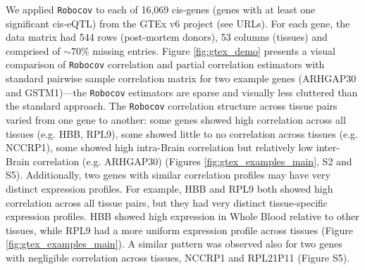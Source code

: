\documentclass{bioinfo}
\def\Robocov{\texttt{Robocov}}
\begin{document}
We applied \Robocov{} to each of 16,069 cis-genes (genes with at least one significant cis-eQTL) from the GTEx v6 project \cite{dey2017} (see URLs). For each gene, the data matrix had 544 rows (post-mortem donors), 53 columns (tissues) and comprised of $\sim70\%$ missing entries.  Figure \ref{fig:gtex_demo} presents a visual comparison of \Robocov{} correlation and partial correlation estimators with standard pairwise sample correlation matrix for two example genes (ARHGAP30 and GSTM1)---the \Robocov{} estimators are sparse and visually less cluttered than the standard approach. The \Robocov{} correlation structure across tissue pairs varied from one gene to another: some genes showed high correlation across all tissues (e.g. HBB, RPL9), some showed little to no correlation across tissues (e.g. NCCRP1), some showed high intra-Brain correlation but relatively low inter-Brain correlation (e.g. ARHGAP30) (Figures \ref{fig:gtex_examples_main},  S2 and S5). Additionally, two genes with similar correlation profiles may have very distinct expression profiles. For example,  HBB and RPL9 both showed high correlation across all tissue pairs, but they had very  distinct tissue-specific expression profiles. HBB showed high expression in Whole Blood relative to other tissues, while RPL9 had a more uniform expression profile across tissues (Figure \ref{fig:gtex_examples_main}). A similar pattern was observed also for two genes with negligible correlation across tissues, NCCRP1 and RPL21P11 (Figure S5). 
\end{document}
